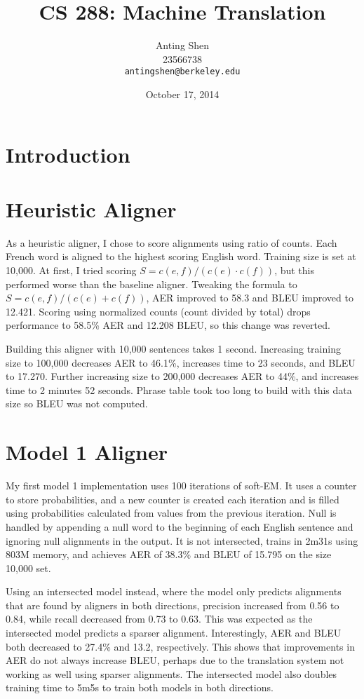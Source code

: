 \documentclass[11pt]{article}
\title{CS 288: Machine Translation}
\author{Anting Shen \\
  23566738 \\
  {\tt antingshen@berkeley.edu} \\
}
\date{October 17, 2014}
\begin{document}
\maketitle

\section{Introduction}


\section{Heuristic Aligner}

As a heuristic aligner, I chose to score alignments using ratio of counts. Each French word
is aligned to the highest scoring English word. Training size is set at 10,000.
At first, I tried scoring $S = c(e, f) / (c(e) \cdot c(f))$, but this performed worse than the
baseline aligner. Tweaking the formula to $S = c(e, f) / (c(e) + c(f))$, AER improved to 58.3%
and BLEU improved to 12.421. Scoring using normalized counts (count divided by total) drops
performance to 58.5\% AER and 12.208 BLEU, so this change was reverted.

Building this aligner with 10,000 sentences takes 1 second. Increasing training size to 100,000
decreases AER to 46.1\%, increases time to 23 seconds, and BLEU to 17.270. Further increasing
size to 200,000 decreases AER to 44\%, and increases time to 2 minutes 52 seconds. Phrase table
took too long to build with this data size so BLEU was not computed.

\section{Model 1 Aligner}

My first model 1 implementation uses 100 iterations of soft-EM. It uses a counter to store
probabilities, and a new counter is created each iteration and is filled using probabilities
calculated from values from the previous iteration. Null is handled by appending a null word to
the beginning of each English sentence and ignoring null alignments in the output.
It is not intersected, trains in 2m31s using 803M memory, and achieves AER of 38.3\%
and BLEU of 15.795 on the size 10,000 set.

Using an intersected model instead, where the model only predicts alignments that are found by
aligners in both directions, precision increased from 0.56 to 0.84, while recall decreased from
0.73 to 0.63. This was expected as the intersected model predicts a sparser alignment.
Interestingly, AER and BLEU both decreased to 27.4\% and 13.2, respectively. This shows that
improvements in AER do not always increase BLEU, perhaps due to the translation system
not working as well using sparser alignments. The intersected model also doubles training time
to 5m5s to train both models in both directions.
\end{document}
